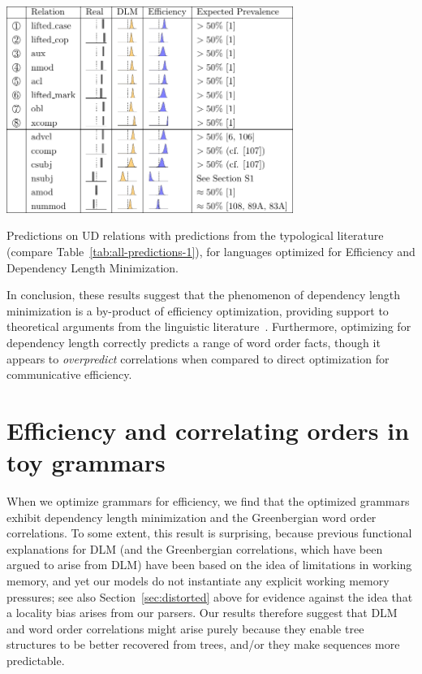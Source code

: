 \documentclass[10pt,twoside,lineno]{article}
\begin{document}
\begin{table}[ht] 
	\begin{center}	
\includegraphics[width=0.7\textwidth]{si-table-perrel-1b-1.png}
\end{center}
\caption{Predictions on UD relations with predictions from the typological literature (compare Table~\ref{tab:all-predictions-1}), for languages optimized for Efficiency and Dependency Length Minimization.
}
\label{tab:all-predictions-1b}
\end{table}

In conclusion, these results suggest that the phenomenon of dependency length minimization is a by-product of efficiency optimization, providing support to theoretical arguments from the linguistic literature~\cite{hawkins1994performance,futrell2017memory, futrell2017generalizing}.
Furthermore, optimizing for dependency length correctly predicts a range of word order facts, though it appears to \emph{overpredict} correlations when compared to direct optimization for communicative efficiency.






\section{Efficiency and correlating orders in toy grammars}

%

When we optimize grammars for efficiency, we find that the optimized grammars exhibit dependency length minimization and the Greenbergian word order correlations. To some extent, this result is surprising, because previous functional explanations for DLM (and the Greenbergian correlations, which have been argued to arise from DLM) have been based on the idea of limitations in working memory, and yet our models do not instantiate any explicit working memory pressures; see also Section~\ref{sec:distorted} above for evidence against the idea that a locality bias arises from our parsers. Our results therefore suggest that DLM and word order correlations might arise purely because they enable tree structures to be better recovered from trees, and/or they make sequences more predictable. 
\end{document}
